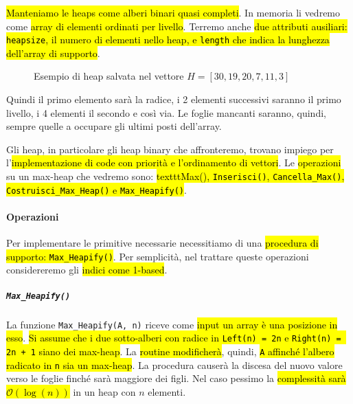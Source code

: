 \documentclass[a4paper,11pt,oneside]{article}
\theoremstyle{plain}
\theoremstyle{definition}
\theoremstyle{remark}
\begin{document}
\hl{Manteniamo le heaps come alberi binari quasi completi}. In memoria li
vedremo come \hl{array di elementi ordinati per livello}. Terremo anche \hl{due
attributi ausiliari: \texttt{heapsize}, il numero di elementi nello heap, e
\texttt{length} che indica la lunghezza dell'array di supporto}.

\begin{figure}[htb]
  \centering
  \caption{Esempio di heap salvata nel vettore $H = [ 30, 19, 20, 7, 11, 3 ]$}%
  \label{fig:es-heap}
\end{figure}

Quindi il primo elemento sarà la radice, i 2 elementi successivi saranno il
primo livello, i 4 elementi il secondo e così via. Le foglie mancanti saranno,
quindi, sempre quelle a occupare gli ultimi posti dell'array.

Gli heap, in particolare gli heap binary che affronteremo, trovano impiego per
l'\hl{implementazione di code con priorità e l'ordinamento di vettori}. Le
\hl{operazioni} su un max-heap che vedremo sono: \hl{texttt{Max()},
\texttt{Inserisci()}, \texttt{Cancella\_Max()}, \texttt{Costruisci\_Max\_Heap()}
e \texttt{Max\_Heapify()}}.

\paragraph{Operazioni} Per implementare le primitive necessarie necessitiamo di
una \hl{procedura di supporto: \texttt{Max\_Heapify()}}. Per semplicità, nel trattare
queste operazioni considereremo gli \hl{indici come 1-based}.

\subparagraph{\texttt{Max\_Heapify()}} La funzione \texttt{Max\_Heapify(A, n)}
riceve come \hl{input un array è una posizione in esso}. \hl{Si assume che i due
sotto-alberi con radice in \texttt{Left(n) = 2n} e \texttt{Right(n) = 2n + 1}
siano dei max-heap}. La \hl{routine modificherà}, quindi, \hl{\texttt{A}
affinché l'albero radicato in \texttt{n} sia un max-heap}. La procedura causerà
la discesa del nuovo valore verso le foglie finché sarà maggiore dei figli. Nel
caso pessimo la \hl{complessità sarà $\mathcal{O}(\log(n))$} in un heap con $n$
elementi.
\end{document}

